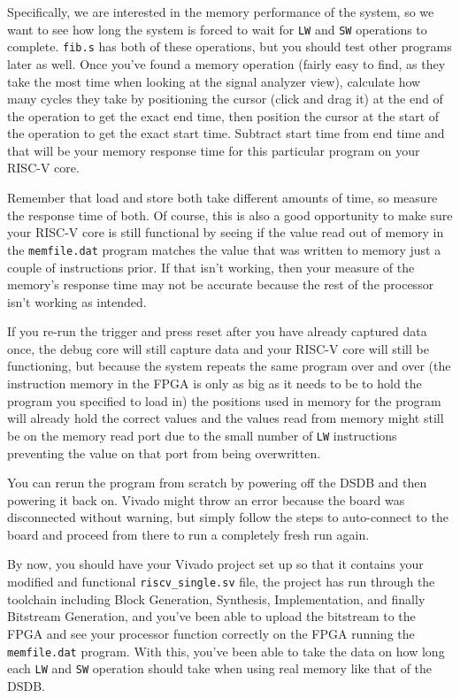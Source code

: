 \documentclass{article}
\begin{document}
\begin{enumerate}
Specifically, we are interested in
the memory performance of the system, so we want to see how long the system is
forced to wait for \verb|LW| and \verb|SW| operations to complete.
\verb|fib.s| has both of these operations, but you should test other
programs later as well.  Once you've found a memory operation (fairly easy to
find, as they take the most time when looking at the signal analyzer view),
calculate how many cycles they take by positioning the cursor (click and drag
it) at the end of the operation to get the exact end time, then position the
cursor at the start of the operation to get the exact start time.  Subtract
start time from end time and that will be your memory response time for this
particular program on your RISC-V core.

Remember that load and store both take
different amounts of time, so measure the response time of both.  Of course,
this is also a good opportunity to make sure your RISC-V core is still functional
by seeing if the value read out of memory in the \verb|memfile.dat| program
matches the value that was written to memory just a couple of instructions
prior.  If that isn't working, then your measure of the memory's response time
may not be accurate because the rest of the processor isn't working as intended.

If you re-run the trigger and press reset after you have already captured data
once, the debug core will still capture data and your RISC-V core will still be
functioning, but because the system repeats the same program over and over (the
instruction memory in the FPGA is only as big as it needs to be to hold the
program you specified to load in) the positions used in memory for the program
will already hold the correct values and the values read from memory might still
be on the memory read port due to the small number of \verb|LW| instructions
preventing the value on that port from being overwritten.

You can rerun the program from scratch by powering off the DSDB and then
powering it back on.  Vivado might throw an error because the board was
disconnected without warning, but simply follow the steps to auto-connect to the
board and proceed from there to run a completely fresh run again.
\end{enumerate}

By now, you should have your Vivado project set up so that it contains your
modified and functional \verb|riscv_single.sv| file, the project has run through
the toolchain including Block Generation, Synthesis, Implementation, and finally
Bitstream Generation, and you've been able to upload the bitstream to the FPGA
and see your processor function correctly on the FPGA running the
\verb|memfile.dat| program.  With this, you've been able to take the data on how
long each \verb|LW| and \verb|SW| operation should take when using real memory
like that of the DSDB.
\end{document}

